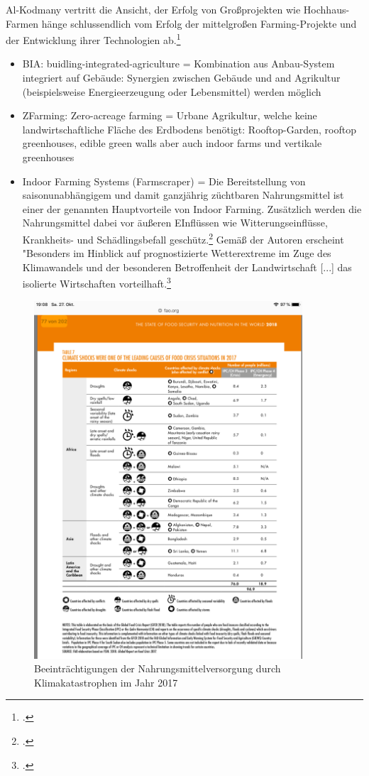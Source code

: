 \documentclass{scrartcl}
\begin{document}
Al-Kodmany vertritt die Ansicht, der Erfolg von Großprojekten wie Hochhaus-Farmen hänge schlussendlich vom Erfolg der mittelgroßen Farming-Projekte und der Entwicklung ihrer Technologien ab.\footcite[Vgl.][S.2ff]{Al-Kodmany2018TheCity}

\begin{itemize}
    \item BIA: buidling-integrated-agriculture = Kombination aus Anbau-System integriert auf  Gebäude: Synergien zwischen Gebäude und  and Agrikultur (beispielsweise Energieerzeugung oder Lebensmittel) werden möglich
    \item ZFarming: Zero-acreage farming = Urbane Agrikultur, welche keine landwirtschaftliche Fläche des Erdbodens benötigt: Rooftop-Garden, rooftop greenhouses, edible green walls aber auch indoor farms und vertikale greenhouses
    \item Indoor Farming Systems (Farmscraper) = Die Bereitstellung von saisonunabhängigem und damit ganzjährig züchtbaren Nahrungsmittel ist einer der genannten Hauptvorteile von Indoor Farming. Zusätzlich werden die Nahrungsmittel dabei vor äußeren EInflüssen wie Witterungseinflüsse, Krankheits- und Schädlingsbefall geschütz.\footcite{Schulz2013UrbaneLandmanagements} Gemäß der Autoren erscheint "Besonders im Hinblick auf prognostizierte Wetterextreme im Zuge des Klimawandels und der besonderen Betroffenheit der Landwirtschaft [...] das isolierte Wirtschaften vorteilhaft.\footcite{Schulz2013UrbaneLandmanagements}
\end{itemize}


\begin{figure}[htbp]
\centering
\includegraphics[width=10cm]{image_folder/beeintrachtigungklima.png}
\caption{Beeinträchtigungen der Nahrungsmittelversorgung durch Klimakatastrophen im Jahr 2017}
\label{fig:Die Grafik visualisiert den Zusammenhang zwischen Klima und Versorgung: Beeinträchtigungen der Nahrungsmittelversorgung durch Klimakatastrophen im Jahr 2017}
\end{figure}
   
\end{document}
